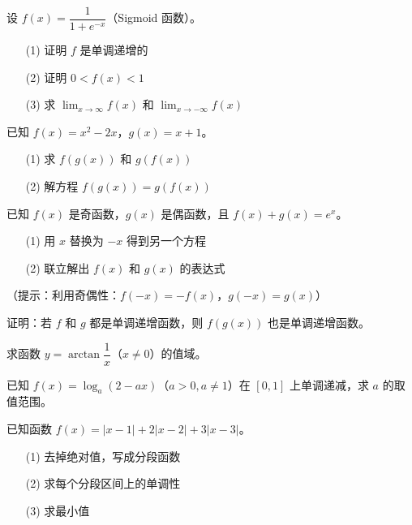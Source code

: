 \begin{exercise}[4]
设 \(f(x) = \dfrac{1}{1 + e^{-x}}\)（Sigmoid 函数）。
\begin{enumerate}
  \item[(1)] 证明 \(f\) 是单调递增的
  \item[(2)] 证明 \(0 < f(x) < 1\)
  \item[(3)] 求 \(\lim_{x \to \infty} f(x)\) 和 \(\lim_{x \to -\infty} f(x)\)
\end{enumerate}
\end{exercise}

\begin{exercise}[4]
已知 \(f(x) = x^2 - 2x\)，\(g(x) = x + 1\)。
\begin{enumerate}
  \item[(1)] 求 \(f(g(x))\) 和 \(g(f(x))\)
  \item[(2)] 解方程 \(f(g(x)) = g(f(x))\)
\end{enumerate}
\end{exercise}


\begin{exercise}[5]
已知 \(f(x)\) 是奇函数，\(g(x)\) 是偶函数，且 \(f(x) + g(x) = e^x\)。
\begin{enumerate}
  \item[(1)] 用 \(x\) 替换为 \(-x\) 得到另一个方程
  \item[(2)] 联立解出 \(f(x)\) 和 \(g(x)\) 的表达式
\end{enumerate}
（提示：利用奇偶性：\(f(-x) = -f(x)\)，\(g(-x) = g(x)\)）
\end{exercise}

\begin{exercise}[5]
证明：若 \(f\) 和 \(g\) 都是单调递增函数，则 \(f(g(x))\) 也是单调递增函数。
\end{exercise}

\begin{exercise}[5]
求函数 \(y = \arctan \dfrac{1}{x}\)（\(x \neq 0\)）的值域。
\end{exercise}

\begin{exercise}[5]
已知 \(f(x) = \log_a (2 - ax)\)（\(a > 0, a \neq 1\)）在 \([0, 1]\) 上单调递减，求 \(a\) 的取值范围。
\end{exercise}


\begin{exercise}[6]
已知函数 \(f(x) = |x - 1| + 2|x - 2| + 3|x - 3|\)。
\begin{enumerate}
  \item[(1)] 去掉绝对值，写成分段函数
  \item[(2)] 求每个分段区间上的单调性
  \item[(3)] 求最小值
\end{enumerate}
\end{exercise}

